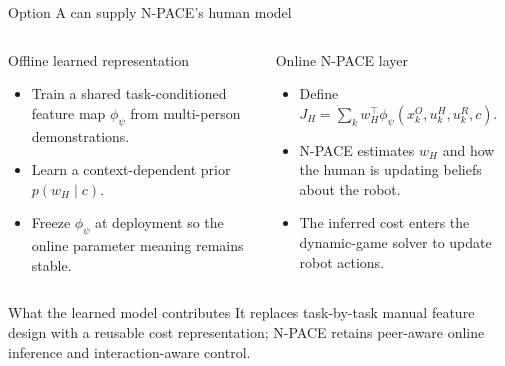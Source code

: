 \documentclass[aspectratio=169,11pt]{beamer}
\begin{document}
\begin{frame}{Option A can supply N-PACE's human model}
\begin{columns}[T,onlytextwidth]
\begin{block}{Offline learned representation}
\begin{itemize}
  \item Train a shared task-conditioned feature map $\phi_\psi$ from multi-person demonstrations.
  \item Learn a context-dependent prior $p(w_H\mid c)$.
  \item Freeze $\phi_\psi$ at deployment so the online parameter meaning remains stable.
\end{itemize}
\end{block}
\begin{block}{Online N-PACE layer}
\begin{itemize}
  \item Define $J_H=\sum_k w_H^\top\phi_\psi(x_k^O,u_k^H,u_k^R,c)$.
  \item N-PACE estimates $w_H$ and how the human is updating beliefs about the robot.
  \item The inferred cost enters the dynamic-game solver to update robot actions.
\end{itemize}
\end{block}
\end{columns}
\vspace{0.25cm}
\begin{alertblock}{What the learned model contributes}
It replaces task-by-task manual feature design with a reusable cost representation; N-PACE retains peer-aware online inference and interaction-aware control.
\end{alertblock}
\end{frame}
\end{document}
